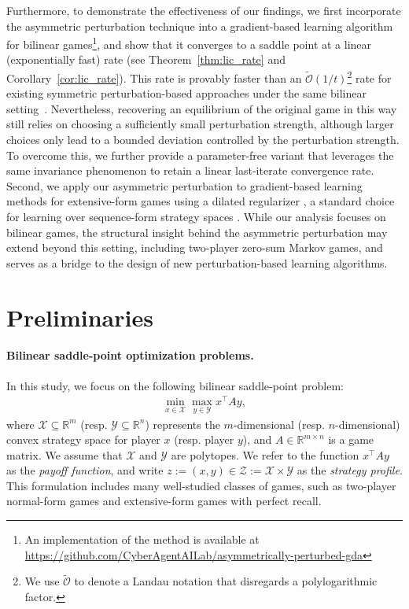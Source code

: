 \documentclass{article}
\newcommand{\R}{\mathbb{R}}
\newcommand{\X}{\mathcal{X}}
\newcommand{\Y}{\mathcal{Y}}
\newcommand{\Z}{\mathcal{Z}}
\theoremstyle{plain}
\begin{document}
Furthermore, to demonstrate the effectiveness of our findings, we first incorporate the asymmetric perturbation technique into a gradient-based learning algorithm for bilinear games\footnote{An implementation of the method is available at \url{https://github.com/CyberAgentAILab/asymmetrically-perturbed-gda}}, and show that it converges to a saddle point at a linear (exponentially fast) rate (see Theorem~\ref{thm:lic_rate} and Corollary~\ref{cor:lic_rate}).
This rate is provably faster than an $\tilde{\mathcal{O}}(1/t)$\footnote{We use $\tilde{\mathcal{O}}$ to denote a Landau notation that disregards a polylogarithmic factor.} rate for existing symmetric perturbation-based approaches under the same bilinear setting~\citep{liu2022power}.
Nevertheless, recovering an equilibrium of the original game in this way still relies on choosing a sufficiently small perturbation strength, although larger choices only lead to a bounded deviation controlled by the perturbation strength.
To overcome this, we further provide a parameter-free variant that leverages the same invariance phenomenon to retain a linear last-iterate convergence rate.
Second, we apply our asymmetric perturbation to gradient-based learning methods for extensive-form games using a dilated regularizer \citep{hoda2010smoothing}, a standard choice for learning over sequence-form strategy spaces \citep{VONSTENGEL1996220}.
While our analysis focuses on bilinear games, the structural insight behind the asymmetric perturbation may extend beyond this setting, including two-player zero-sum Markov games, and serves as a bridge to the design of new perturbation-based learning algorithms.


\section{Preliminaries}
\label{sec:preiminaries}
\paragraph{Bilinear saddle-point optimization problems.}
In this study, we focus on the following bilinear saddle-point problem:
\begin{align}
    \min_{x\in \X}\max_{y\in \Y} x^{\top}Ay,
    \label{eq:minimax_optimization}
\end{align}
where $\X\subseteq \R^m$ (resp. $\Y\subseteq \R^n$) represents the $m$-dimensional (resp. $n$-dimensional) convex strategy space for player $x$ (resp. player $y$), and $A\in \R^{m\times n}$ is a game matrix.
We assume that $\X$ and $\Y$ are polytopes.
We refer to the function $x^{\top}Ay$ as the \emph{payoff function}, and write $z:=(x, y)\in \Z := \X\times \Y$ as the \emph{strategy profile}.
This formulation includes many well-studied classes of games, such as two-player normal-form games and extensive-form games with perfect recall.
\end{document}

